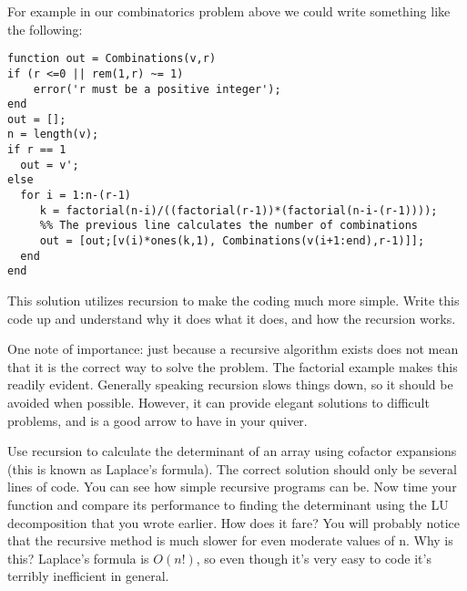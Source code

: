 For example in our combinatorics problem above we could write something like the following:

\begin{lstlisting}
function out = Combinations(v,r)
if (r <=0 || rem(1,r) ~= 1)
	error('r must be a positive integer');
end
out = [];
n = length(v);
if r == 1
  out = v';
else
  for i = 1:n-(r-1)
     k = factorial(n-i)/((factorial(r-1))*(factorial(n-i-(r-1))));
     %% The previous line calculates the number of combinations
     out = [out;[v(i)*ones(k,1), Combinations(v(i+1:end),r-1)]];
  end
end
\end{lstlisting}

This solution utilizes recursion to make the coding much more simple. Write this code up and understand why it does what it does, and how the recursion works.

One note of importance: just because a recursive algorithm exists does not mean that it is the correct way to solve the problem. The factorial example makes this readily evident. Generally speaking recursion slows things down, so it should be avoided when possible. However, it can provide elegant solutions to difficult problems, and is a good arrow to have in your quiver.

\begin{problem}
Use recursion to calculate the determinant of an array using cofactor expansions (this is known as Laplace's formula). The correct solution should only be several lines of code. You can see how simple recursive programs can be. Now time your function and compare its performance to finding the determinant using the LU decomposition that you wrote earlier. How does it fare? You will probably notice that the recursive method is much slower for even moderate values of n. Why is this? Laplace's formula is $O(n!)$, so even though it's very easy to code it's terribly inefficient in general.
\end{problem}

